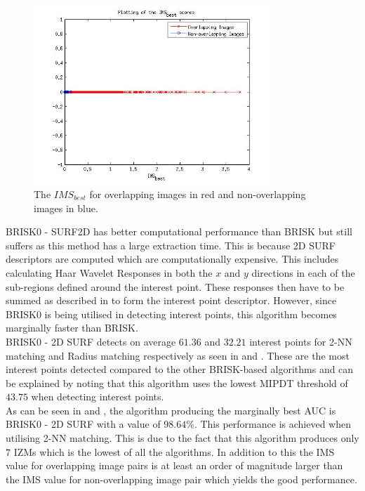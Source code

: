 \documentclass{report}
\begin{document}
\begin{figure}
  \centering
    \includegraphics[width=0.8\textwidth]{../Drawings/Matching/MatchingScore_BRISK0UBRISK.jpg}
    \caption{The $IMS_{best}$ for overlapping images in red and non-overlapping images in blue.} 
    \label{fig:separate_ubrisk}
\end{figure}

BRISK0 - SURF2D has better computational performance than BRISK but still suffers as this method has a large extraction time. This is because 2D SURF descriptors are computed which are computationally expensive. This includes calculating Haar Wavelet Responses in both the $x$ and $y$ directions in each of the sub-regions defined around the interest point. These responses then have to be summed as described in  to form the interest point descriptor. However, since BRISK0 is being utilised in detecting interest points, this algorithm becomes marginally faster than BRISK.\\

BRISK0 - 2D SURF detects on average $61.36$ and $32.21$ interest points for 2-NN matching and Radius matching respectively as seen in  and . These are the most interest points detected compared to the other BRISK-based algorithms and can be explained by noting that this algorithm uses the lowest MIPDT threshold of $43.75$ when detecting interest points. \\

As can be seen in  and , the algorithm producing the marginally best AUC is BRISK0 - 2D SURF with a value of $98.64\%$. This performance is achieved when utilising 2-NN matching. This is due to the fact that this algorithm produces only $7$ IZMs which is the lowest of all the algorithms. In addition to this the IMS value for overlapping image pairs is at least an order of magnitude larger than the IMS value for non-overlapping image pair which yields the good performance. \\
\end{document}
